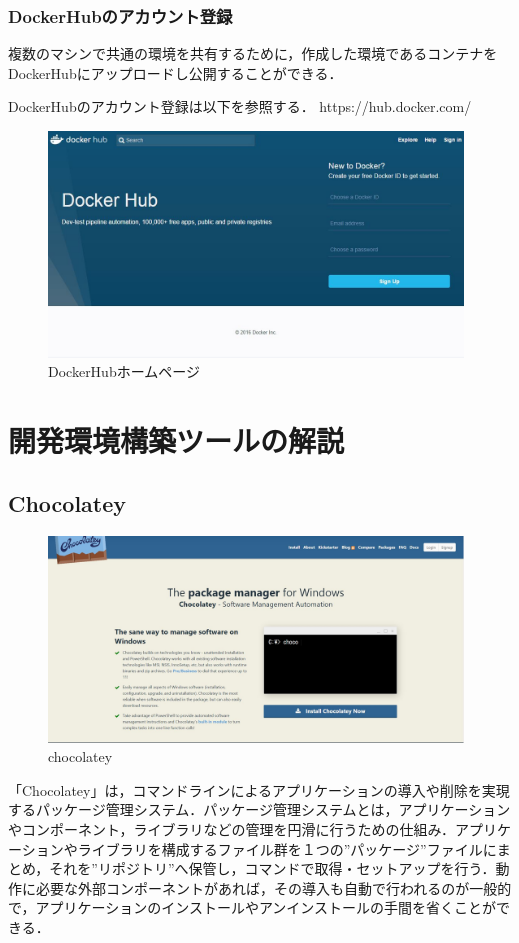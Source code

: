 \newpage

\subsection{DockerHubのアカウント登録}
複数のマシンで共通の環境を共有するために，作成した環境であるコンテナをDockerHubにアップロードし公開することができる．

DockerHubのアカウント登録は以下を参照する．
https://hub.docker.com/
\begin{figure}[htb]
\centering
\includegraphics[width=11cm]{26.JPG}
\caption{DockerHubホームページ}\label{tab:uac}
\end{figure}

\chapter{開発環境構築ツールの解説}

\section{Chocolatey}
\begin{figure}[htb]
\centering
\includegraphics[width=11cm]{32.JPG}
\caption{chocolatey}\label{tab:uac}
\end{figure}
「Chocolatey」は，コマンドラインによるアプリケーションの導入や削除を実現するパッケージ管理システム．パッケージ管理システムとは，アプリケーションやコンポーネント，ライブラリなどの管理を円滑に行うための仕組み．アプリケーションやライブラリを構成するファイル群を１つの”パッケージ”ファイルにまとめ，それを”リポジトリ”へ保管し，コマンドで取得・セットアップを行う．動作に必要な外部コンポーネントがあれば，その導入も自動で行われるのが一般的で，アプリケーションのインストールやアンインストールの手間を省くことができる．


